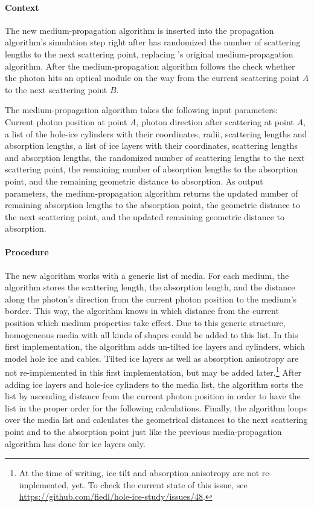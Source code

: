 \paragraph{Context}

The new medium-propagation algorithm is inserted into the
\clsim propagation algorithm's simulation step right after \clsim has
randomized the number of scattering lengths to the next scattering
point, replacing \clsim's original medium-propagation algorithm. After
the medium-propagation algorithm follows the check whether the photon
hits an optical module on the way from the current scattering point
\(A\) to the next scattering point \(B\).

The medium-propagation algorithm takes the following input parameters:
Current photon position at point \(A\), photon direction after
scattering at point \(A\), a list of the hole-ice cylinders with their
coordinates, radii, scattering lengths and absorption lengths, a list of
ice layers with their coordinates, scattering lengths and absorption
lengths, the randomized number of scattering lengths to the next
scattering point, the remaining number of absorption lengths to the
absorption point, and the remaining geometric distance to absorption. As
output parameters, the medium-propagation algorithm returns the updated
number of remaining absorption lengths to the absorption point, the
geometric distance to the next scattering point, and the updated
remaining geometric distance to absorption.

\paragraph{Procedure}

The new algorithm works with a generic list of media. For each medium,
the algorithm stores the scattering length, the absorption length, and
the distance along the photon's direction from the current photon
position to the medium's border. This way, the algorithm knows in which
distance from the current position which medium properties take effect.
Due to this generic structure, homogeneous media with all kinds of
shapes could be added to this list. In this first implementation, the
algorithm adds un-tilted ice layers and cylinders, which model hole ice
and cables. Tilted ice layers as well as absorption anisotropy are not
re-implemented in this first implementation, but may be added
later.\footnote{At the time of writing, ice tilt and absorption anisotropy are not re-implemented, yet. To check the current state of this issue, see \url{https://github.com/fiedl/hole-ice-study/issues/48}.}
After adding ice layers and hole-ice cylinders to the media list, the
algorithm sorts the list by ascending distance from the current photon
position in order to have the list in the proper order for the following
calculations. Finally, the algorithm loops over the media list and
calculates the geometrical distances to the next scattering point and to
the absorption point just like the previous media-propagation algorithm
has done for ice layers only.

